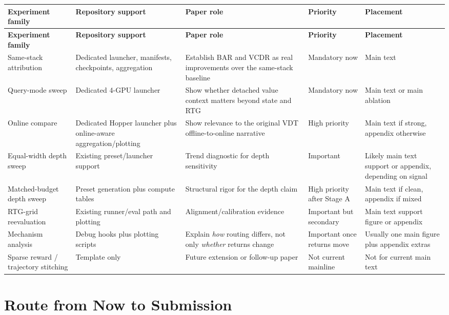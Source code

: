\documentclass[11pt]{article}
\newcommand{\vdt}{\textsc{VDT}}
\begin{document}
\begin{longtable}{>{\raggedright\arraybackslash}p{} >{\raggedright\arraybackslash}p{} >{\raggedright\arraybackslash}p{} >{\raggedright\arraybackslash}p{} >{\raggedright\arraybackslash}p{}}
\toprule
\textbf{Experiment family} & \textbf{Repository support} & \textbf{Paper role} & \textbf{Priority} & \textbf{Placement} \\
\midrule
\endfirsthead
\toprule
\textbf{Experiment family} & \textbf{Repository support} & \textbf{Paper role} & \textbf{Priority} & \textbf{Placement} \\
\midrule
\endhead
Same-stack attribution & Dedicated launcher, manifests, checkpoints, aggregation & Establish BAR and VCDR as real improvements over the same-stack baseline & Mandatory now & Main text \\
Query-mode sweep & Dedicated 4-GPU launcher & Show whether detached value context matters beyond state and RTG & Mandatory now & Main text or main ablation \\
Online compare & Dedicated Hopper launcher plus online-aware aggregation/plotting & Show relevance to the original \vdt{} offline-to-online narrative & High priority & Main text if strong, appendix otherwise \\
Equal-width depth sweep & Existing preset/launcher support & Trend diagnostic for depth sensitivity & Important & Likely main text support or appendix, depending on signal \\
Matched-budget depth sweep & Preset generation plus compute tables & Structural rigor for the depth claim & High priority after Stage A & Main text if clean, appendix if mixed \\
RTG-grid reevaluation & Existing runner/eval path and plotting & Alignment/calibration evidence & Important but secondary & Main text support figure or appendix \\
Mechanism analysis & Debug hooks plus plotting scripts & Explain \emph{how} routing differs, not only \emph{whether} returns change & Important once returns move & Usually one main figure plus appendix extras \\
Sparse reward / trajectory stitching & Template only & Future extension or follow-up paper & Not current mainline & Not for current main text \\
\bottomrule
\end{longtable}

\section{Route from Now to Submission}
\end{document}
